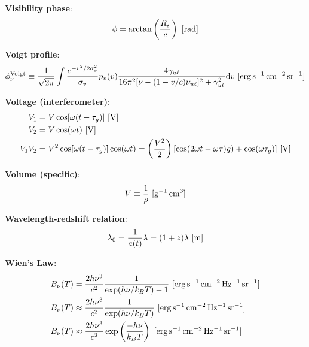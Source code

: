 \documentclass[a4paper,10pt]{article}
\begin{document}
{\noindent}\textbf{Visibility phase}:
\begin{align*}
    \phi = \arctan \left(\frac{R_s}{c}\right) ~ [{\rm rad}]
\end{align*}

{\noindent}\textbf{Voigt profile}:
\begin{align*}
    \phi_\nu^{\rm Voigt} \equiv \frac{1}{\sqrt{2\pi}} \int \frac{e^{-v^2/2\sigma_v^2}}{\sigma_v} p_v(v) \frac{4\gamma_{u\ell}}{16\pi^2[\nu-(1-v/c)\nu_{u\ell}]^2 + \gamma_{u\ell}^2}{\rm d}v  ~ [{\rm erg\,s^{-1}\,cm^{-2}\,sr^{-1}}]
\end{align*}

{\noindent}\textbf{Voltage (interferometer)}:
\begin{align*}
    V_1 &= V\cos[\omega(t-\tau_g)] ~ [{\rm V}] \\
    V_2 &= V\cos(\omega t) ~ [{\rm V}] \\
    V_1V_2 &= V^2\cos[\omega(t-\tau_g)]\cos(\omega t) = \left(\frac{V^2}{2}\right) [\cos(2\omega t-\omega \tau)g)+\cos(\omega\tau_g)] ~ [{\rm V}]
\end{align*}

{\noindent}\textbf{Volume (specific)}:
\begin{align*}
    V \equiv \frac{1}{\rho}~ [{\rm g^{-1}\,cm^3}]
\end{align*}

{\noindent}\textbf{Wavelength-redshift relation}:
\begin{align*}
    \lambda_0 = \frac{1}{a(t)}\lambda = (1+z)\lambda ~ [{\rm m}]
\end{align*}

{\noindent}\textbf{Wien's Law}:
\begin{align*}
    B_\nu(T) &= \frac{2h\nu^3}{c^2} \frac{1}{\exp(h\nu/k_BT) - 1} ~ [{\rm erg\,s^{-1}\,cm^{-2}\,Hz^{-1}\,sr^{-1}}] \\
    B_\nu(T) &\approx \frac{2h\nu^3}{c^2} \frac{1}{\exp(h\nu/k_BT)} ~ [{\rm erg\,s^{-1}\,cm^{-2}\,Hz^{-1}\,sr^{-1}}] \\
    B_\nu(T) &\approx \frac{2h\nu^3}{c^2} \exp\left(\frac{-h\nu}{k_BT}\right) ~ [{\rm erg\,s^{-1}\,cm^{-2}\,Hz^{-1}\,sr^{-1}}]
\end{align*}
\end{document}

